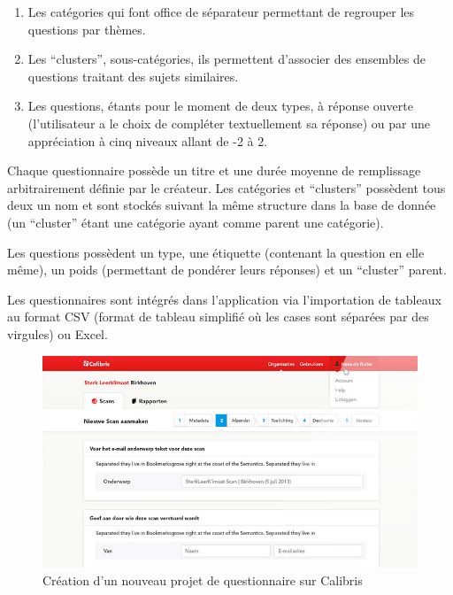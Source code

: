 \documentclass[12pt,a4paper]{book}
\begin{document}
\begin{enumerate}
  \item Les catégories qui font office de séparateur permettant de regrouper les questions par thèmes.
  \item Les ``clusters'', sous-catégories, ils permettent d'associer des ensembles de questions traitant des sujets similaires.
  \item Les questions, étants pour le moment de deux types, à réponse ouverte (l'utilisateur a le choix de compléter textuellement sa réponse) ou par une appréciation à cinq niveaux allant de -2 à 2.
\end{enumerate}

Chaque questionnaire possède un titre et une durée moyenne de remplissage arbitrairement définie par le créateur. Les catégories et ``clusters'' possèdent tous deux un nom et sont stockés suivant la même structure dans la base de donnée (un ``cluster'' étant une catégorie ayant comme parent une catégorie).

Les questions possèdent un type, une étiquette (contenant la question en elle même), un poids (permettant de pondérer leurs réponses) et un ``cluster'' parent.

Les questionnaires sont intégrés dans l'application via l'importation de tableaux au format CSV (format de tableau simplifié où les cases sont séparées par des virgules) ou Excel.

\begin{figure}[htp]
\centering
\includegraphics[scale=0.6]{img/calibris1.png}
 \caption{Création d'un nouveau projet de questionnaire sur Calibris}
 \label{fig.calibris1}
\end{figure}
\end{document}
